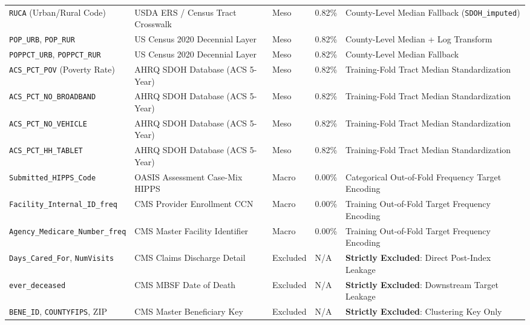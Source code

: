 \documentclass[10pt,journal]{IEEEtran}
\begin{document}
\begin{table}[!t]
\begin{tabular}{p{}p{}p{}p{}p{}}
\texttt{RUCA} (Urban/Rural Code) & USDA ERS / Census Tract Crosswalk & Meso & 0.82\% & County-Level Median Fallback (\texttt{SDOH\_imputed}) \\
\texttt{POP\_URB}, \texttt{POP\_RUR} & US Census 2020 Decennial Layer & Meso & 0.82\% & County-Level Median + Log Transform \\
\texttt{POPPCT\_URB}, \texttt{POPPCT\_RUR}& US Census 2020 Decennial Layer & Meso & 0.82\% & County-Level Median Fallback \\
\texttt{ACS\_PCT\_POV} (Poverty Rate) & AHRQ SDOH Database (ACS 5-Year) & Meso & 0.82\% & Training-Fold Tract Median Standardization \\
\texttt{ACS\_PCT\_NO\_BROADBAND} & AHRQ SDOH Database (ACS 5-Year) & Meso & 0.82\% & Training-Fold Tract Median Standardization \\
\texttt{ACS\_PCT\_NO\_VEHICLE} & AHRQ SDOH Database (ACS 5-Year) & Meso & 0.82\% & Training-Fold Tract Median Standardization \\
\texttt{ACS\_PCT\_HH\_TABLET} & AHRQ SDOH Database (ACS 5-Year) & Meso & 0.82\% & Training-Fold Tract Median Standardization \\
\texttt{Submitted\_HIPPS\_Code} & OASIS Assessment Case-Mix HIPPS & Macro & 0.00\% & Categorical Out-of-Fold Frequency Target Encoding \\
\texttt{Facility\_Internal\_ID\_freq} & CMS Provider Enrollment CCN & Macro & 0.00\% & Training Out-of-Fold Target Frequency Encoding \\
\texttt{Agency\_Medicare\_Number\_freq}& CMS Master Facility Identifier & Macro & 0.00\% & Training Out-of-Fold Target Frequency Encoding \\
\midrule
\texttt{Days\_Cared\_For}, \texttt{NumVisits} & CMS Claims Discharge Detail & Excluded & N/A & \textbf{Strictly Excluded}: Direct Post-Index Leakage \\
\texttt{ever\_deceased} & CMS MBSF Date of Death & Excluded & N/A & \textbf{Strictly Excluded}: Downstream Target Leakage \\
\texttt{BENE\_ID}, \texttt{COUNTYFIPS}, ZIP & CMS Master Beneficiary Key & Excluded & N/A & \textbf{Strictly Excluded}: Clustering Key Only \\
\bottomrule
\end{tabular}
\end{table}
\end{document}
